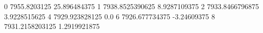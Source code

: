 0 7955.8203125 25.896484375
1 7938.8525390625 8.9287109375
2 7933.8466796875 3.9228515625
4 7929.923828125 0.0
6 7926.677734375 -3.24609375
8 7931.2158203125 1.2919921875
